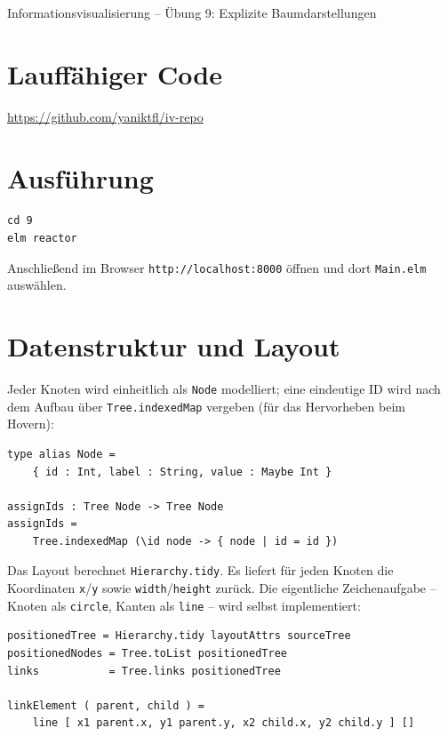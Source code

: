 \documentclass[11pt,a4paper]{article}
\begin{document}
\begin{center}
    {\Large Informationsvisualisierung -- Übung 9: Explizite Baumdarstellungen}
\end{center}

\section*{Lauffähiger Code}

\href{https://github.com/yaniktfl/iv-repo}{https://github.com/yaniktfl/iv-repo}

\section*{Ausführung}

\begin{verbatim}
cd 9
elm reactor
\end{verbatim}

Anschließend im Browser \texttt{http://localhost:8000} öffnen und dort
\texttt{Main.elm} auswählen.

\section*{Datenstruktur und Layout}

Jeder Knoten wird einheitlich als \texttt{Node} modelliert; eine eindeutige
ID wird nach dem Aufbau über \texttt{Tree.indexedMap} vergeben (für das
Hervorheben beim Hovern):

\begin{verbatim}
type alias Node =
    { id : Int, label : String, value : Maybe Int }

assignIds : Tree Node -> Tree Node
assignIds =
    Tree.indexedMap (\id node -> { node | id = id })
\end{verbatim}

Das Layout berechnet \texttt{Hierarchy.tidy}. Es liefert für jeden Knoten die
Koordinaten \texttt{x}/\texttt{y} sowie \texttt{width}/\texttt{height} zurück.
Die eigentliche Zeichenaufgabe -- Knoten als \texttt{circle}, Kanten als
\texttt{line} -- wird selbst implementiert:

\begin{verbatim}
positionedTree = Hierarchy.tidy layoutAttrs sourceTree
positionedNodes = Tree.toList positionedTree
links           = Tree.links positionedTree

linkElement ( parent, child ) =
    line [ x1 parent.x, y1 parent.y, x2 child.x, y2 child.y ] []
\end{verbatim}
\end{document}
